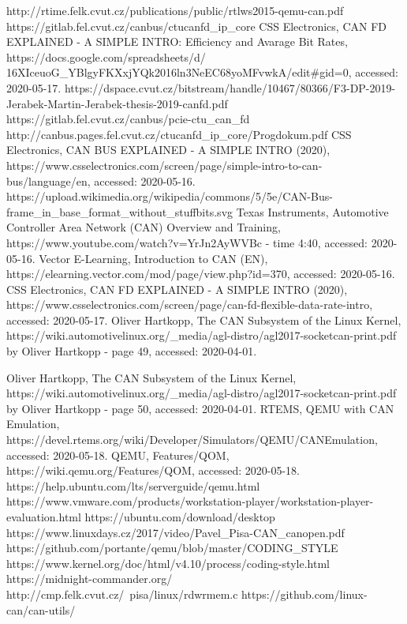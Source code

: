 \documentclass{ctuthesis}
\begin{document}
 
\renewcommand\bibname{References}
\begin{thebibliography}{1}
 http://rtime.felk.cvut.cz/publications/public/rtlws2015-qemu-can.pdf
 https://gitlab.fel.cvut.cz/canbus/ctucanfd\_ip\_core
 CSS Electronics, CAN FD EXPLAINED - A SIMPLE INTRO: Efficiency and Avarage Bit Rates, https://docs.google.com/spreadsheets/d/\\16XIceuoG\_YBlgyFKXxjYQk2016ln3NeEC68yoMFvwkA/edit\#gid=0, accessed: 2020-05-17.
 https://dspace.cvut.cz/bitstream/handle/10467/80366/F3-DP-2019-Jerabek-Martin-Jerabek-thesis-2019-canfd.pdf
 https://gitlab.fel.cvut.cz/canbus/pcie-ctu\_can\_fd
 http://canbus.pages.fel.cvut.cz/ctucanfd\_ip\_core/Progdokum.pdf
 CSS Electronics, CAN BUS EXPLAINED - A SIMPLE INTRO (2020), https://www.csselectronics.com/screen/page/simple-intro-to-can-bus/language/en, accessed: 2020-05-16.
 https://upload.wikimedia.org/wikipedia/commons/5/5e/CAN-Bus-frame\_in\_base\_format\_without\_stuffbits.svg
 Texas Instruments, Automotive Controller Area Network (CAN) Overview and Training, https://www.youtube.com/watch?v=YrJn2AyWVBc - time 4:40, accessed: 2020-05-16.
 Vector E-Learning, Introduction to CAN (EN), https://elearning.vector.com/mod/page/view.php?id=370, accessed: 2020-05-16.
 CSS Electronics, CAN FD EXPLAINED - A SIMPLE INTRO (2020), https://www.csselectronics.com/screen/page/can-fd-flexible-data-rate-intro, accessed: 2020-05-17.
 Oliver Hartkopp, The CAN Subsystem of the Linux Kernel, https://wiki.automotivelinux.org/\_media/agl-distro/agl2017-socketcan-print.pdf by Oliver Hartkopp - page 49, accessed: 2020-04-01.

 Oliver Hartkopp, The CAN Subsystem of the Linux Kernel, https://wiki.automotivelinux.org/\_media/agl-distro/agl2017-socketcan-print.pdf by Oliver Hartkopp - page 50, accessed: 2020-04-01.
 RTEMS, QEMU with CAN Emulation, https://devel.rtems.org/wiki/Developer/Simulators/QEMU/CANEmulation, accessed: 2020-05-18.
 QEMU, Features/QOM, https://wiki.qemu.org/Features/QOM, accessed: 2020-05-18.
 https://help.ubuntu.com/lts/serverguide/qemu.html
 https://www.vmware.com/products/workstation-player/workstation-player-evaluation.html
 https://ubuntu.com/download/desktop
 https://www.linuxdays.cz/2017/video/Pavel\_Pisa-CAN\_canopen.pdf
 https://github.com/portante/qemu/blob/master/CODING\_STYLE
 https://www.kernel.org/doc/html/v4.10/process/coding-style.html
 https://midnight-commander.org/
 http://cmp.felk.cvut.cz/~pisa/linux/rdwrmem.c
 https://github.com/linux-can/can-utils/
\end{thebibliography}
\end{document}
